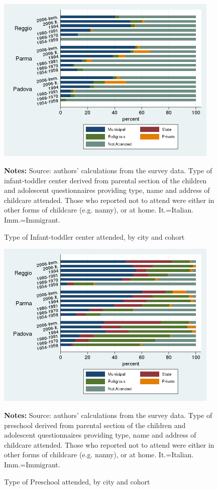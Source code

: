 \documentclass[12pt]{article}
\begin{document}
\begin{figure}[!htb]
\caption{Type of Infant-toddler center attended, by city and cohort}
\label{fig:asiloAttend}
\begin{center}
\includegraphics[height=8cm]{asiloType-Attend.png} \\[0pt]
\end{center}
\par
{\footnotesize {{\bfseries Notes:} Source: authors' calculations from the survey data. Type of infant-toddler center derived from parental section of the children and adolescent questionnaires providing type, name and address of childcare attended. Those who reported not to attend were either in other forms of childcare (e.g. nanny), or at home. It.=Italian. Imm.=Immigrant.} }
\end{figure}

\begin{figure}[!htb]
\caption{Type of Preschool attended, by city and cohort}
\label{fig:preschoolAttend}
\begin{center}
\includegraphics[height=8cm]{maternaType-Attend.png}\\[0pt]
\end{center}
\par
{\footnotesize {{\bfseries Notes:} Source: authors' calculations from the survey data. Type of preschool derived from parental section of the children and adolescent questionnaires providing type, name and address of childcare attended. Those who reported not to attend were either in other forms of childcare (e.g. nanny), or at home. It.=Italian. Imm.=Immigrant.} }
\end{figure}
\end{document}

